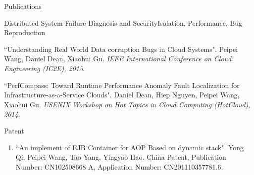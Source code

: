 \documentclass{professional} %
\begin{document}
\begin{rSection}{Publications}
\begin{rSubsection}{Distributed System Failure Diagnosis and Security}{Isolation, Performance, Bug Reproduction}
\item ``Understanding Real World Data corruption Bugs in Cloud Systems". Peipei Wang, Daniel Dean, Xiaohui Gu. \textit{IEEE International Conference on Cloud Engineering (IC2E), 2015}. \href{https://ieeexplore.ieee.org/stamp/stamp.jsp?arnumber=7092909}{}

\item ``PerfCompass: Toward Runtime Performance Anomaly Fault Localization for Infrastructure-as-a-Service Clouds". Daniel Dean, Hiep Nguyen, Peipei Wang, Xiaohui Gu. \textit{USENIX Workshop on Hot Topics in Cloud Computing (HotCloud), 2014}. \href{https://www.usenix.org/system/files/conference/hotcloud14/hotcloud14-dean.pdf}{}

\end{rSubsection}
\end{rSection}

\begin{rSection}{Patent} 
\begin{enumerate}[wide, labelwidth=!, labelindent=0pt]
\item ``An implement of EJB Container for AOP Based on dynamic stack". Yong Qi, Peipei Wang, Tao Yang, Yingyao Hao. China Patent, Publication Number: CN102508668 A, Application Number: CN201110357781.6.  \href{https://patents.google.com/patent/CN102508668A/en}{}
\end{enumerate}
\end{rSection}







\end{document}
